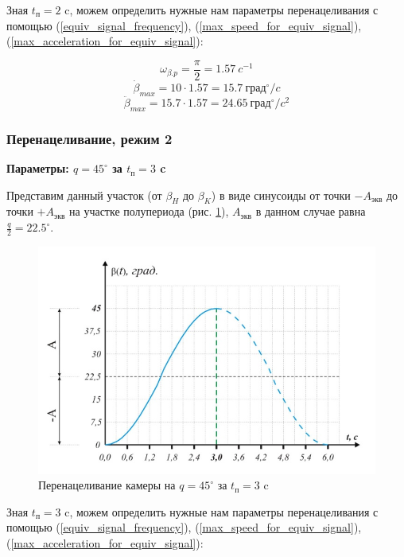Зная $t_{\text{п} } = 2$ c, можем определить нужные нам параметры перенацеливания
с помощью (\ref{equiv_signal_frequency}),
(\ref{max_speed_for_equiv_signal}),
(\ref{max_acceleration_for_equiv_signal}):

$$
    \omega_{\beta.p} = \frac{\pi}{2} = 1.57 ~c^{-1}
$$
$$
    \dot{\beta}_{max} = 10 \cdot 1.57 = 15.7 ~\text{град}^{\circ} / c
$$
$$
    \ddot{\beta}_{max} = 15.7 \cdot 1.57 = 24.65 ~\text{град}^{\circ} / c^{2}
$$

\subsubsection{Перенацеливание, режим 2}

\textbf{Параметры: $q = 45^{\circ}$ за $t_{\text{п}} = 3$ c}

Представим данный участок (от $\beta_{H}$ до $\beta_{K}$) в виде синусоиды от
точки $-A_\text{экв}$ до точки $+A_\text{экв}$ на участке полупериода
(рис. \ref{retarget_45grad_3sec}), $A_\text{экв}$ в данном случае равна
$\frac{q}{2} = 22.5^{\circ}$.

\begin{figure}[h!]
    \centering
    \includegraphics[keepaspectratio]{./src/pictures/retarget_equivalent_input_signals/45grad_3sec}
    \caption{Перенацеливание камеры на $q = 45^{\circ}$ за $t_\text{п} = 3$ c}
    \label{retarget_45grad_3sec}
\end{figure}

Зная $t_{\text{п} } = 3$ c, можем определить нужные нам параметры перенацеливания
с помощью (\ref{equiv_signal_frequency}),
(\ref{max_speed_for_equiv_signal}),
(\ref{max_acceleration_for_equiv_signal}):


